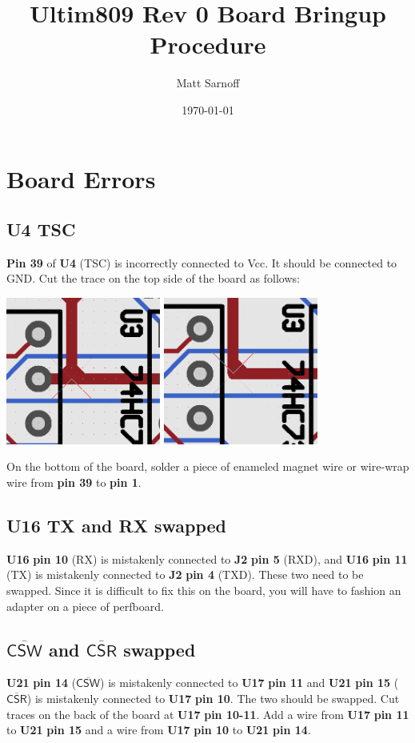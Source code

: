 \documentclass[letterpaper,11pt]{article}
\title{Ultim809 Rev 0 Board Bringup Procedure}
\author{Matt Sarnoff}
\date{\today}
\newcommand{\net}[1]{\textsf{#1}}
\newcommand{\Net}[1]{\ensuremath{\overline{\textsf{#1}}}}
\newcommand{\Vcc}{\net{Vcc}}
\newcommand{\GND}{\net{GND}}
\newcommand{\Pin}[1]{\textbf{Pin #1}}
\newcommand{\pin}[1]{\textbf{pin #1}}
\newcommand{\rpin}[2]{\refdes{#1} \pin{#2}}
\newcommand{\rnpin}[3]{\refdes{#1} \pin{#2} (\net{#3})}
\newcommand{\rNpin}[3]{\refdes{#1} \pin{#2} (\Net{#3})}
\newcommand{\refdes}[1]{\textbf{#1}}
\begin{document}
\maketitle
\section{Board Errors}
\subsection{\refdes{U4} \net{TSC}}
\Pin{39} of \refdes{U4} (\net{TSC}) is incorrectly connected to \Vcc. It should be connected to \GND. Cut the trace on the top side of the board as follows:

\includegraphics[width=2in]{badtrace1a.png}
\includegraphics[width=2in]{badtrace1b.png}

On the bottom of the board, solder a piece of enameled magnet wire or wire-wrap wire from \pin{39} to \pin{1}.

\subsection{\refdes{U16} \net{TX} and \net{RX} swapped}
\rnpin{U16}{10}{RX} is mistakenly connected to \rnpin{J2}{5}{RXD}, and \rnpin{U16}{11}{TX} is mistakenly connected to \rnpin{J2}{4}{TXD}. These two need to be swapped. Since it is difficult to fix this on the board, you will have to fashion an adapter on a piece of perfboard.

\subsection{\Net{CSW} and \Net{CSR} swapped}
\rNpin{U21}{14}{CSW} is mistakenly connected to \rpin{U17}{11} and \rNpin{U21}{15}{CSR} is mistakenly connected to \rpin{U17}{10}. The two should be swapped. Cut traces on the back of the board at \rpin{U17}{10-11}. Add a wire from \rpin{U17}{11} to \rpin{U21}{15} and a wire from \rpin{U17}{10} to \rpin{U21}{14}.
\end{document}
